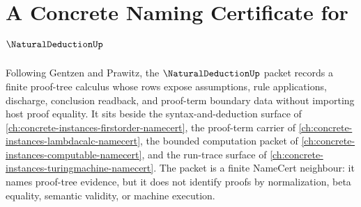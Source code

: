 \chapter{A Concrete Naming Certificate for $\NaturalDeductionUp$}
\label{ch:concrete-instances-natural-deduction-namecert}

Following Gentzen and Prawitz, the $\NaturalDeductionUp$ packet records a finite proof-tree calculus whose rows expose assumptions, rule applications, discharge, conclusion readback, and proof-term boundary data without importing host proof equality. It sits beside the syntax-and-deduction surface of \autoref{ch:concrete-instances-firstorder-namecert}, the proof-term carrier of \autoref{ch:concrete-instances-lambdacalc-namecert}, the bounded computation packet of \autoref{ch:concrete-instances-computable-namecert}, and the run-trace surface of \autoref{ch:concrete-instances-turingmachine-namecert}. The packet is a finite NameCert neighbour: it names proof-tree evidence, but it does not identify proofs by normalization, beta equality, semantic validity, or machine execution.

